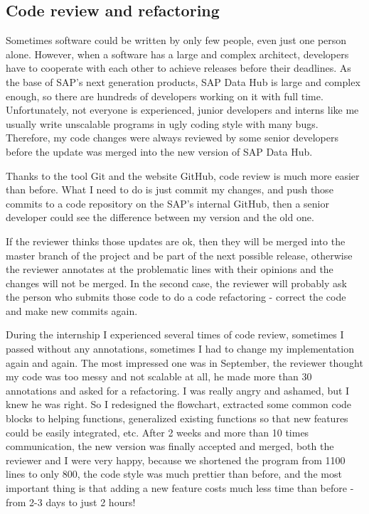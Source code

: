 \documentclass[article,colorback,accentcolor=tud4c]{tudreport}
\begin{document}
	\subsection{Code review and refactoring}
	
	Sometimes software could be written by only few people, even just one person alone. However, when a software has a large and complex architect, developers have to cooperate with each other to achieve releases before their deadlines. As the base of SAP's next generation products, SAP Data Hub is large and complex enough, so there are hundreds of developers working on it with full time. Unfortunately, not everyone is experienced, junior developers and interns like me usually write unscalable programs in ugly coding style with many bugs. Therefore, my code changes were always reviewed by some senior developers before the update was merged into the new version of SAP Data Hub.
	
	Thanks to the tool Git and the website GitHub, code review is much more easier than before. What I need to do is just commit my changes, and push those commits to a code repository on the SAP's internal GitHub, then a senior developer could see the difference between my version and the old one.
	
	If the reviewer thinks those updates are ok, then they will be merged into the master branch of the project and be part of the next possible release, otherwise the reviewer annotates at the problematic lines with their opinions and the changes will not be merged. In the second case, the reviewer will probably ask the person who submits those code to do a code refactoring - correct the code and make new commits again.
	
	During the internship I experienced several times of code review, sometimes I passed without any annotations, sometimes I had to change my implementation again and again. The most impressed one was in September, the reviewer thought my code was too messy and not scalable at all, he made more than 30 annotations and asked for a refactoring. I was really angry and ashamed, but I knew he was right. So I redesigned the flowchart, extracted some common code blocks to helping functions, generalized existing functions so that new features could be easily integrated, etc. After 2 weeks and more than 10 times communication, the new version was finally accepted and merged, both the reviewer and I were very happy, because we shortened the program from 1100 lines to only 800, the code style was much prettier than before, and the most important thing is that adding a new feature costs much less time than before - from 2-3 days to just 2 hours!
	
\end{document}
